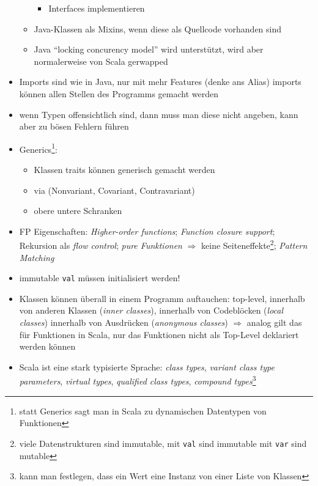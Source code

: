 \begin{itemize}
\begin{itemize}
\begin{itemize}
      \item Interfaces implementieren
    \end{itemize}    
    \item Java-Klassen als Mixins, wenn diese als Quellcode vorhanden
    sind
    \item Java \enquote{locking \und concurency model} wird unterstützt, wird
    aber normalerweise von Scala gerwapped
  \end{itemize}
  \item Imports sind wie in Java, nur mit mehr Features (denke ans
  Alias) \und imports können allen Stellen des Programms gemacht werden
  \item wenn Typen offensichtlich sind, dann muss man diese nicht angeben, kann
  aber zu bösen Fehlern führen
  \item Generics\footnote{statt Generics sagt man in Scala zu 
  dynamischen Datentypen von Funktionen }:
  \begin{itemize}
    \item Klassen \und traits können generisch gemacht werden
    \item via  (Nonvariant, Covariant, Contravariant)
    \item obere \und untere Schranken
  \end{itemize}
  \item FP Eigenschaften: \textit{Higher-order functions}; 
  \textit{Function closure support}; Rekursion als \textit{flow control}; 
  \textit{pure Funktionen} $\Rightarrow$ keine 
  Seiteneffekte\footnote{viele Datenstrukturen sind immutable, mit 
  \texttt{val} sind immutable \und mit \texttt{var} sind mutable};
  \textit{Pattern Matching}
  \item immutable \texttt{val} müssen initialisiert werden!  
  \item Klassen können überall in einem Programm auftauchen: top-level,
  innerhalb von anderen Klassen (\textit{inner classes}), innerhalb von
  Codeblöcken (\textit{local classes}) \und innerhalb von Ausdrücken 
  (\textit{anonymous classes}) $\Rightarrow$ analog gilt das für Funktionen
  in Scala, nur das Funktionen nicht als Top-Level deklariert werden können
  \item Scala ist eine stark typisierte Sprache: \textit{class types},
  \textit{variant class type parameters}, \textit{virtual types}, 
  \textit{qualified class types},  \textit{compound types}\footnote{kann
  man festlegen, dass ein Wert eine Instanz von einer Liste von Klassen
}
\end{itemize}
